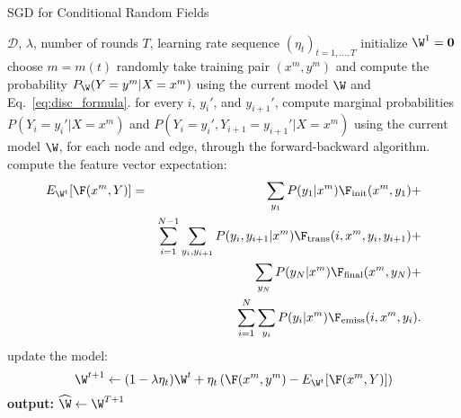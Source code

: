 \begin{algorithm}[h!]
   \caption{SGD for Conditional Random Fields \label{alg:crf_online}}
\begin{algorithmic}[1]
    $\mathcal{D}$, $\lambda$, number of rounds $T$,
   learning rate sequence $(\eta_t)_{t = 1,\ldots,T}$
   \STATE initialize $\W^1 = \mathbf{0}$
	\STATE choose $m=m(t)$ randomly
	\STATE take training pair $(x^m, y^m)$ and compute the probability 
	$P_{\W}(Y=y^m|X=x^m)$ using the current model ${\W}$ and Eq.~\ref{eq:disc_formula}.
	\STATE for every $i$, $y_i'$, and $y_{i+1}'$, 
	compute marginal probabilities $P(Y_i=y_i' | X=x^m)$ and  $P(Y_i=y_i', Y_{i+1}=y_{i+1}'| X=x^m)$ 
	using the current model $\W$, for each node and edge, 
        through the forward-backward algorithm.
	\STATE compute the feature vector expectation:  
	\begin{eqnarray}
	E_{\W^t}[\F(x^m,Y)] &=& \sum_{y_1} P(y_1|x^m)\F_{\mathrm{init}}(x^m,y_1) +\nonumber\\
	&& \sum_{i=1}^{N-1}\sum_{y_i,y_{i+1}} P(y_i,y_{i+1}|x^m)\F_{\mathrm{trans}}(i,x^m,y_i,y_{i+1}) +\nonumber\\
	&& \sum_{y_N} P(y_N|x^m)\F_{\mathrm{final}}(x^m,y_N) +\nonumber\\
	&& \sum_{i=1}^{N}\sum_{y_i} P(y_i|x^m)\F_{\mathrm{emiss}}(i,x^m,y_i).
	\end{eqnarray}
	\STATE update the model: 
	$$\W^{t+1} \leftarrow (1-\lambda \eta_t) \boldsymbol{\W}^{t} + \eta_t \left( \F(x^m,y^m) 
	- E_{\W^t}[\F(x^m,Y)]\right)$$
	\ENDFOR
   \STATE \textbf{output:} $\widehat{\W} \leftarrow \W^{T+1}$
\end{algorithmic}
\end{algorithm}


